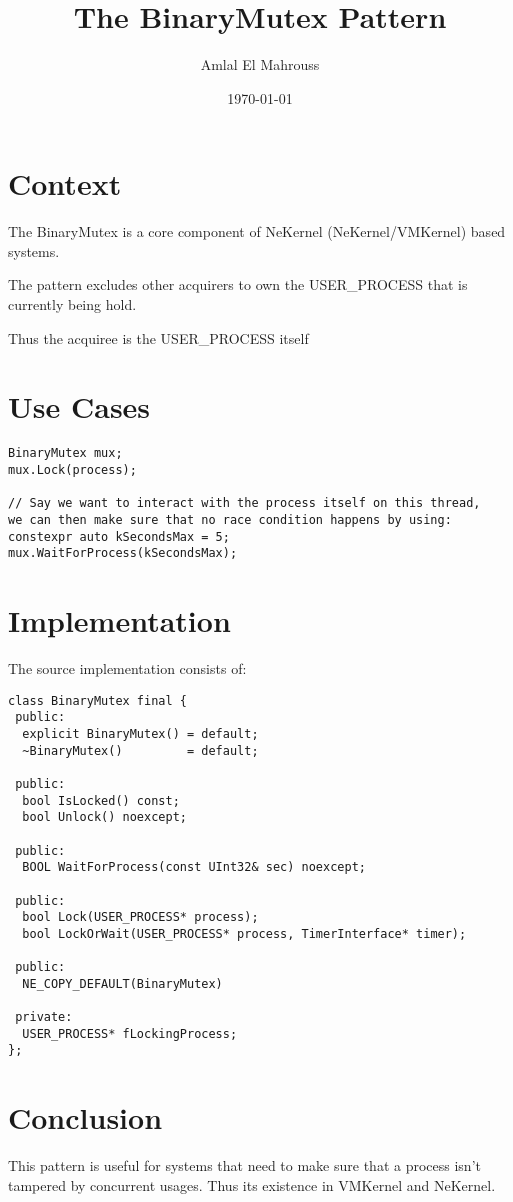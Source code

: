 \documentclass{article}
\title{The BinaryMutex Pattern}
\author{Amlal El Mahrouss}
\date{\today}
\begin{document}
\maketitle

\section{Context}

The BinaryMutex is a core component of NeKernel (NeKernel/VMKernel) based systems.

The pattern excludes other acquirers to own the USER\_PROCESS that is currently being hold.

Thus the acquiree is the USER\_PROCESS itself

\section{Use Cases}

\begin{verbatim}
BinaryMutex mux;
mux.Lock(process);

// Say we want to interact with the process itself on this thread, 
we can then make sure that no race condition happens by using:
constexpr auto kSecondsMax = 5;
mux.WaitForProcess(kSecondsMax); 
\end{verbatim}

\section{Implementation}

The source implementation consists of:

\begin{verbatim}
class BinaryMutex final {
 public:
  explicit BinaryMutex() = default;
  ~BinaryMutex()         = default;

 public:
  bool IsLocked() const;
  bool Unlock() noexcept;

 public:
  BOOL WaitForProcess(const UInt32& sec) noexcept;

 public:
  bool Lock(USER_PROCESS* process);
  bool LockOrWait(USER_PROCESS* process, TimerInterface* timer);

 public:
  NE_COPY_DEFAULT(BinaryMutex)

 private:
  USER_PROCESS* fLockingProcess;
};
\end{verbatim}

\section{Conclusion}

This pattern is useful for systems that need to make sure that a process isn't tampered by concurrent usages. Thus its existence in VMKernel and NeKernel.
\end{document}
